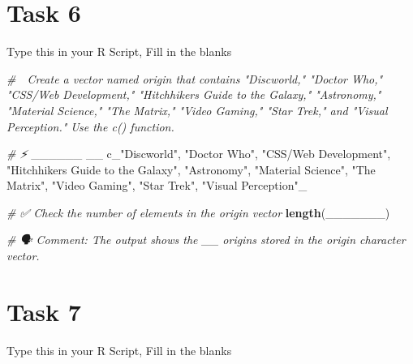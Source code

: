 \documentclass[
  12pt,
]{scrreprt}
\newenvironment{Shaded}{\begin{snugshade}}{\end{snugshade}}
\newcommand{\CommentTok}[1]{\textcolor[rgb]{0.56,0.35,0.01}{\textit{#1}}}
\newcommand{\FunctionTok}[1]{\textcolor[rgb]{0.13,0.29,0.53}{\textbf{#1}}}
\newcommand{\NormalTok}[1]{#1}
\newcommand{\StringTok}[1]{\textcolor[rgb]{0.31,0.60,0.02}{#1}}
\begin{document}
\section{Task 6}\label{task-6}

Type this in your R Script, Fill in the blanks

\begin{Shaded}
\begin{Highlighting}[]
\CommentTok{\# 🎯 Create a vector named \textasciigrave{}origin\textasciigrave{} that contains "Discworld," "Doctor Who," "CSS/Web Development," "Hitchhiker\textquotesingle{}s Guide to the Galaxy," "Astronomy," "Material Science," "The Matrix," "Video Gaming," "Star Trek," and "Visual Perception." Use the \textasciigrave{}c()\textasciigrave{} function.}

\CommentTok{\# ⚡ }
\NormalTok{\_\_\_\_\_\_ \_\_ c\_}\StringTok{"Discworld"}\NormalTok{, }\StringTok{"Doctor Who"}\NormalTok{, }\StringTok{"CSS/Web Development"}\NormalTok{, }\StringTok{"Hitchhiker\textquotesingle{}s Guide to the Galaxy"}\NormalTok{, }\StringTok{"Astronomy"}\NormalTok{, }\StringTok{"Material Science"}\NormalTok{, }\StringTok{"The Matrix"}\NormalTok{, }\StringTok{"Video Gaming"}\NormalTok{, }\StringTok{"Star Trek"}\NormalTok{, }\StringTok{"Visual Perception"}\NormalTok{\_}

\CommentTok{\# ✅ Check the number of elements in the origin vector}
\FunctionTok{length}\NormalTok{(\_\_\_\_\_\_\_)}

\CommentTok{\# 🗣 Comment: The output shows the \_\_ origins stored in the \textasciigrave{}origin\textasciigrave{} character vector.}
\end{Highlighting}
\end{Shaded}

\section{Task 7}\label{task-7}

Type this in your R Script, Fill in the blanks
\end{document}
